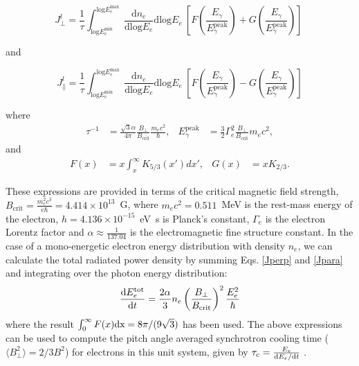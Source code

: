 \documentclass[usenatbib]{mnras}
\begin{document}
\begin{equation}
 {J_{\perp}^l} = \frac{1}{\tau}  \int_{\mathrm{log}E_e^{\mathrm{min}}}^{\mathrm{log}E_e^{\mathrm{max}}} \  \frac{\mathrm{d}n_e}{\mathrm{dlog}E_{e}} \mathrm{dlog}E_{e}\  \left[F\left(\frac{E_{\gamma}}{E_{\gamma}^{\mathrm{peak}}}\right) + G\left(\frac{E_{\gamma}}{E_{\gamma}^{\mathrm{peak}}}\right)\right] \
 \label{Jperp}
\end{equation}

\noindent and

\begin{equation}
{J_{\parallel}^l} = \frac{1}{\tau} \int_{\mathrm{log}E_e^{\mathrm{min}}}^{\mathrm{log}E_e^{\mathrm{max}}} \ \frac{\mathrm{d}n_e}{\mathrm{dlog}E_{e}} \mathrm{dlog}E_{e}\  \left[F\left(\frac{E_{\gamma}}{E_{\gamma}^{\mathrm{peak}}}\right) - G\left(\frac{E_{\gamma}}{E_{\gamma}^{\mathrm{peak}}}\right)\right] 
\label{Jpara}
\end{equation}

\noindent where
\begin{align}
\tau^{-1} &= \frac{\sqrt{3} \alpha}{4\pi}\frac{B_{\perp}}{B_{\mathrm{crit}}}\frac{m_{e}c^{2}}{\hbar},
 & 
E_{\gamma}^{\mathrm{peak}} &= \frac{3}{2}\Gamma_{e}^2 \frac{B_{\perp}}{B_{\mathrm{crit}}} m_{e} c^2,
\nonumber
\end{align}
and
\begin{align}
F(x) &= x \int_x^\infty K_{5/3}(x') dx', &
G(x) &= x K_{2/3}.
\nonumber
\end{align}

These expressions are provided in terms of the critical magnetic field strength, $B_{\mathrm{crit}} = \frac{m_e^2c^3}{e\hbar} = 4.414 \times 10^{13}$~G, where $m_e c^{2} = 0.511$~MeV is the rest-mass energy of the electron, $h = 4.136 \times 10^{-15}$~eV~s is Planck's constant, $\Gamma_{e}$ is the electron Lorentz factor and $\alpha \approx \frac{1}{137.04}$ is the electromagnetic fine structure constant. 
In the case of a mono-energetic electron energy distribution with density $n_{e}$, we can calculate the total radiated power density by summing Eqs. \ref{Jperp} and \ref{Jpara} and integrating over the photon energy distribution:
\begin{equation}
\frac{{\rm d}E_e^{\rm tot}}{{\rm d}t} = \frac{2\alpha}{3} n_{e}\left(\frac{B_{\perp}}{B_{\rm crit}}\right)^{2}\frac{E_{e}^{2}}{\hbar}%
\label{Itot_l}
\end{equation}
where the result $\int_0^{\infty} F(x) \rm{d}x = 8\pi/(9\sqrt{3})$ \citep{1959ApJ...130..241W} has been used. The above expressions can be used to compute the pitch angle averaged synchrotron cooling time  ($\langle B_{\perp}^{2}\rangle = 2/3 B^{2}$) for electrons in this unit system, given by $\tau_c = \frac{E_e}{{\rm d}E_e/{\rm d}t}$ \citep{Taylor_Matthews}.
\end{document}
